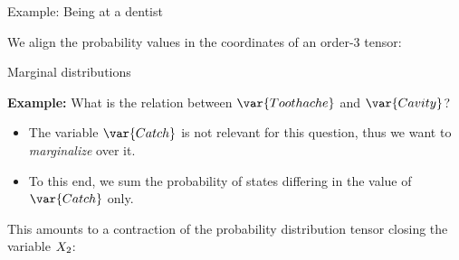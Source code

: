 \documentclass{beamer}
\begin{document}
\begin{frame}{Example: Being at a dentist}
        \par \medskip
        We align the probability values in the coordinates of an order-3 tensor:


    \end{frame}



    \begin{frame}{Marginal distributions}

        {\bf Example:} What is the relation between $\var{Toothache}$ and $\var{Cavity}$?
        \begin{itemize}
            \item The variable $\var{Catch}$ is not relevant for this question, thus we want to \emph{marginalize} over it.
            \item To this end, we sum the probability of states differing in the value of $\var{Catch}$ only.
        \end{itemize}

        This amounts to a contraction of the probability distribution tensor closing the variable $X_{2}$:
        

    \end{frame}
\end{document}
